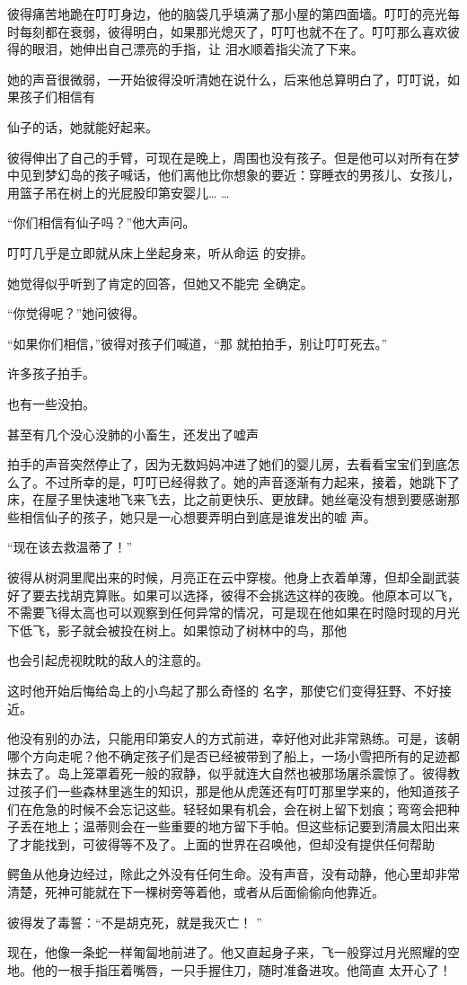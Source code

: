 \documentclass{article}
\begin{document}
彼得痛苦地跪在叮叮身边，他的脑袋几乎填满了那小屋的第四面墙。叮叮的亮光每时每刻都在衰弱，彼得明白，如果那光熄灭了，叮叮也就不在了。叮叮那么喜欢彼得的眼泪，她伸出自己漂亮的手指，让
泪水顺着指尖流了下来。 

她的声音很微弱，一开始彼得没听清她在说什么，后来他总算明白了，叮叮说，如果孩子们相信有

\newpage
仙子的话，她就能好起来。 

彼得伸出了自己的手臂，可现在是晚上，周围也没有孩子。但是他可以对所有在梦中见到梦幻岛的孩子喊话，他们离他比你想象的要近：穿睡衣的男孩儿、女孩儿，用篮子吊在树上的光屁股印第安婴儿…
… 


“你们相信有仙子吗？”他大声问。 

叮叮几乎是立即就从床上坐起身来，听从命运
的安排。 

她觉得似乎听到了肯定的回答，但她又不能完
全确定。 


“你觉得呢？”她问彼得。 

“如果你们相信，”彼得对孩子们喊道，“那
就拍拍手，别让叮叮死去。” 


\newpage

许多孩子拍手。 


也有一些没拍。 

甚至有几个没心没肺的小畜生，还发出了嘘声

拍手的声音突然停止了，因为无数妈妈冲进了她们的婴儿房，去看看宝宝们到底怎么了。不过所幸的是，叮叮已经得救了。她的声音逐渐有力起来，接着，她跳下了床，在屋子里快速地飞来飞去，比之前更快乐、更放肆。她丝毫没有想到要感谢那些相信仙子的孩子，她只是一心想要弄明白到底是谁发出的嘘
声。 


“现在该去救温蒂了！” 

彼得从树洞里爬出来的时候，月亮正在云中穿梭。他身上衣着单薄，但却全副武装好了要去找胡克算账。如果可以选择，彼得不会挑选这样的夜晚。他原本可以飞，不需要飞得太高也可以观察到任何异常的情况，可是现在他如果在时隐时现的月光下低飞，影子就会被投在树上。如果惊动了树林中的鸟，那他
\newpage

也会引起虎视眈眈的敌人的注意的。 

这时他开始后悔给岛上的小鸟起了那么奇怪的
名字，那使它们变得狂野、不好接近。 

他没有别的办法，只能用印第安人的方式前进，幸好他对此非常熟练。可是，该朝哪个方向走呢？他不确定孩子们是否已经被带到了船上，一场小雪把所有的足迹都抹去了。岛上笼罩着死一般的寂静，似乎就连大自然也被那场屠杀震惊了。彼得教过孩子们一些森林里逃生的知识，那是他从虎莲还有叮叮那里学来的，他知道孩子们在危急的时候不会忘记这些。轻轻如果有机会，会在树上留下划痕；弯弯会把种子丢在地上；温蒂则会在一些重要的地方留下手帕。但这些标记要到清晨太阳出来了才能找到，可彼得等不及了。上面的世界在召唤他，但却没有提供任何帮助

鳄鱼从他身边经过，除此之外没有任何生命。没有声音，没有动静，他心里却非常清楚，死神可能就在下一棵树旁等着他，或者从后面偷偷向他靠近。

\newpage

彼得发了毒誓：“不是胡克死，就是我灭亡！
” 

现在，他像一条蛇一样匍匐地前进了。他又直起身子来，飞一般穿过月光照耀的空地。他的一根手指压着嘴唇，一只手握住刀，随时准备进攻。他简直
太开心了！ 
\end{document}
